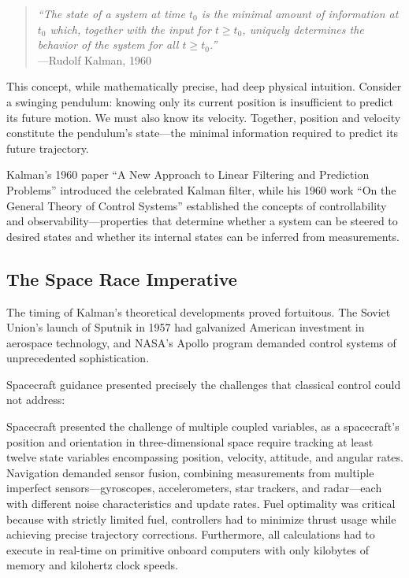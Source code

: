 \begin{quote}
\textit{``The state of a system at time $t_0$ is the minimal amount of information at $t_0$ which, together with the input for $t \geq t_0$, uniquely determines the behavior of the system for all $t \geq t_0$.''}\\
\hfill---Rudolf Kalman, 1960
\end{quote}

This concept, while mathematically precise, had deep physical intuition. Consider a swinging pendulum: knowing only its current position is insufficient to predict its future motion. We must also know its velocity. Together, position and velocity constitute the pendulum's state---the minimal information required to predict its future trajectory.

Kalman's 1960 paper ``A New Approach to Linear Filtering and Prediction Problems'' introduced the celebrated Kalman filter, while his 1960 work ``On the General Theory of Control Systems'' established the concepts of controllability and observability---properties that determine whether a system can be steered to desired states and whether its internal states can be inferred from measurements.

\subsection{The Space Race Imperative}

The timing of Kalman's theoretical developments proved fortuitous. The Soviet Union's launch of Sputnik in 1957 had galvanized American investment in aerospace technology, and NASA's Apollo program demanded control systems of unprecedented sophistication.

Spacecraft guidance presented precisely the challenges that classical control could not address:

Spacecraft presented the challenge of multiple coupled variables, as a spacecraft's position and orientation in three-dimensional space require tracking at least twelve state variables encompassing position, velocity, attitude, and angular rates. Navigation demanded sensor fusion, combining measurements from multiple imperfect sensors---gyroscopes, accelerometers, star trackers, and radar---each with different noise characteristics and update rates. Fuel optimality was critical because with strictly limited fuel, controllers had to minimize thrust usage while achieving precise trajectory corrections. Furthermore, all calculations had to execute in real-time on primitive onboard computers with only kilobytes of memory and kilohertz clock speeds.

